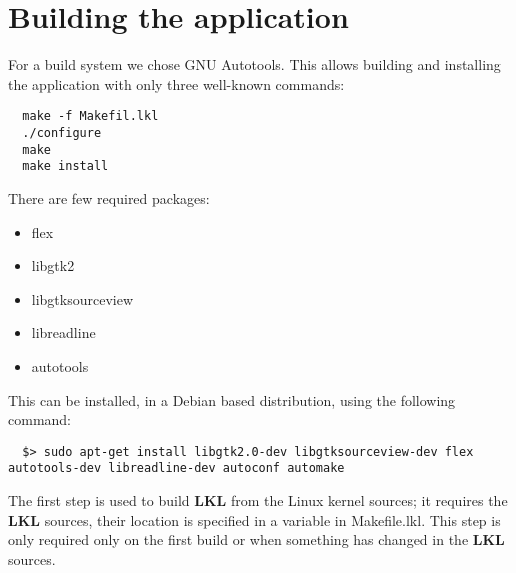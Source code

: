 \chapter{Building the application}

For a build system we chose GNU Autotools. This allows building
and installing the application with only three well-known commands:

\lstset{language=bash,caption=Build System,label=lst:building}
\begin{lstlisting}
  make -f Makefil.lkl
  ./configure
  make
  make install
\end{lstlisting}

There are few required packages:
\begin{itemize}
  \item flex
  \item libgtk2
  \item libgtksourceview
  \item libreadline
  \item autotools
\end{itemize}

This can be installed, in a Debian based distribution, using the following 
command:
\lstset{language=zsh,caption=Required packages,label=lst:bpacakges}
\begin{lstlisting}
  $> sudo apt-get install libgtk2.0-dev libgtksourceview-dev flex autotools-dev libreadline-dev autoconf automake
\end{lstlisting}

The first step is used to build \textbf{LKL} from the Linux kernel sources; it
requires the \textbf{LKL} sources, their location is specified in a variable in
Makefile.lkl. This step is only required only on the first build or
when something has changed in the \textbf{LKL} sources.

